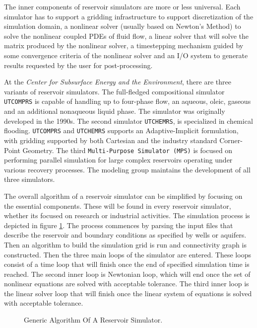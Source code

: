The inner components of reservoir simulators are more or less universal. Each simulator has to support a 
gridding infrastructure to support discretization of the simulation domain, a nonlinear solver (usually based on Newton's Method) to 
solve the nonlinear coupled PDEs of fluid flow, a linear solver that will solve the matrix produced by the nonlinear solver, a timestepping
mechanism guided by some convergence criteria of the nonlinear solver and an I/O system to generate results requested by the user for post-processing.

At the \textit{Center for Subsurface Energy and the Environment}, there are three variants of reservoir simulators. The full-fledged compositional 
simulator \texttt{UTCOMPRS} is capable of handling up to four-phase flow, an aqueous, oleic, gaseous and an additional nonaqueous liquid phase. 
The simulator was originally developed in the 1990s\supercite{utcomp}. The second simulator \texttt{UTCHEMRS}, is specialized in chemical flooding.
\texttt{UTCOMPRS} and \texttt{UTCHEMRS} supports an Adaptive-Implicit formulation, with gridding supported by both Cartesian and the industry standard
Corner-Point Geometry. The third \texttt{Multi-Purpose Simulator (MPS)} is focused on performing parallel simulation for large complex reservoirs operating under
various recovery processes. The modeling group maintains the development of all three simulators. 

The overall algorithm of a reservoir simulator can be simplified by focusing on the essential components. These will be found in every reservoir simulator, whether
its focused on research or industrial activities. The simulation process is depicted in figure \ref{simulator}. The process commences by parsing the input files that describe the
reservoir and boundary conditions as specified by wells or aquifers. Then an algorithm to build the simulation grid is run and connectivity graph is constructed. Then the three main
loops of the simulator are entered. These loops consist of a time loop that will finish once the end of specified simulation time is reached. The second inner loop is Newtonian loop,
which will end once the set of nonlinear equations are solved with acceptable tolerance. The third inner loop is the linear solver loop that will finish once the linear system of equations
is solved with acceptable tolerance.

\begin{figure}[htb]
\raggedright
\resizebox{15cm}{!}{}
\caption{Generic Algorithm Of A Reservoir Simulator.}\label{simulator}
\end{figure}
\clearpage


